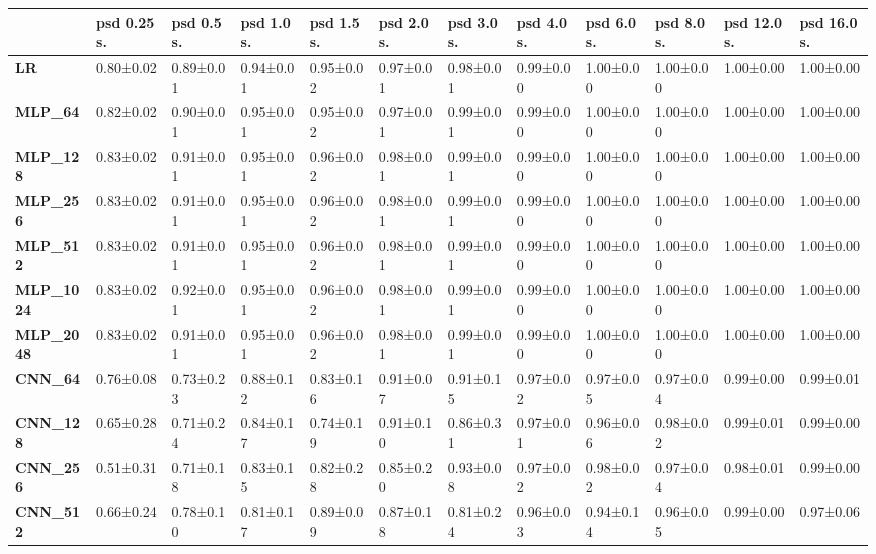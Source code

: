 \begin{tabular}{llllllllllll}
\toprule
{} & psd 0.25 s. & psd 0.5 s. & psd 1.0 s. & psd 1.5 s. & psd 2.0 s. & psd 3.0 s. & psd 4.0 s. & psd 6.0 s. & psd 8.0 s. & psd 12.0 s. & psd 16.0 s. \\
\midrule
\textbf{LR            } &   0.80±0.02 &  0.89±0.01 &  0.94±0.01 &  0.95±0.02 &  0.97±0.01 &  0.98±0.01 &  0.99±0.00 &  1.00±0.00 &  1.00±0.00 &   1.00±0.00 &   1.00±0.00 \\
\textbf{MLP\_64        } &   0.82±0.02 &  0.90±0.01 &  0.95±0.01 &  0.95±0.02 &  0.97±0.01 &  0.99±0.01 &  0.99±0.00 &  1.00±0.00 &  1.00±0.00 &   1.00±0.00 &   1.00±0.00 \\
\textbf{MLP\_128       } &   0.83±0.02 &  0.91±0.01 &  0.95±0.01 &  0.96±0.02 &  0.98±0.01 &  0.99±0.01 &  0.99±0.00 &  1.00±0.00 &  1.00±0.00 &   1.00±0.00 &   1.00±0.00 \\
\textbf{MLP\_256       } &   0.83±0.02 &  0.91±0.01 &  0.95±0.01 &  0.96±0.02 &  0.98±0.01 &  0.99±0.01 &  0.99±0.00 &  1.00±0.00 &  1.00±0.00 &   1.00±0.00 &   1.00±0.00 \\
\textbf{MLP\_512       } &   0.83±0.02 &  0.91±0.01 &  0.95±0.01 &  0.96±0.02 &  0.98±0.01 &  0.99±0.01 &  0.99±0.00 &  1.00±0.00 &  1.00±0.00 &   1.00±0.00 &   1.00±0.00 \\
\textbf{MLP\_1024      } &   0.83±0.02 &  0.92±0.01 &  0.95±0.01 &  0.96±0.02 &  0.98±0.01 &  0.99±0.01 &  0.99±0.00 &  1.00±0.00 &  1.00±0.00 &   1.00±0.00 &   1.00±0.00 \\
\textbf{MLP\_2048      } &   0.83±0.02 &  0.91±0.01 &  0.95±0.01 &  0.96±0.02 &  0.98±0.01 &  0.99±0.01 &  0.99±0.00 &  1.00±0.00 &  1.00±0.00 &   1.00±0.00 &   1.00±0.00 \\
\textbf{CNN\_64        } &   0.76±0.08 &  0.73±0.23 &  0.88±0.12 &  0.83±0.16 &  0.91±0.07 &  0.91±0.15 &  0.97±0.02 &  0.97±0.05 &  0.97±0.04 &   0.99±0.00 &   0.99±0.01 \\
\textbf{CNN\_128       } &   0.65±0.28 &  0.71±0.24 &  0.84±0.17 &  0.74±0.19 &  0.91±0.10 &  0.86±0.31 &  0.97±0.01 &  0.96±0.06 &  0.98±0.02 &   0.99±0.01 &   0.99±0.00 \\
\textbf{CNN\_256       } &   0.51±0.31 &  0.71±0.18 &  0.83±0.15 &  0.82±0.28 &  0.85±0.20 &  0.93±0.08 &  0.97±0.02 &  0.98±0.02 &  0.97±0.04 &   0.98±0.01 &   0.99±0.00 \\
\textbf{CNN\_512       } &   0.66±0.24 &  0.78±0.10 &  0.81±0.17 &  0.89±0.09 &  0.87±0.18 &  0.81±0.24 &  0.96±0.03 &  0.94±0.14 &  0.96±0.05 &   0.99±0.00 &   0.97±0.06 \\

\end{tabular}
